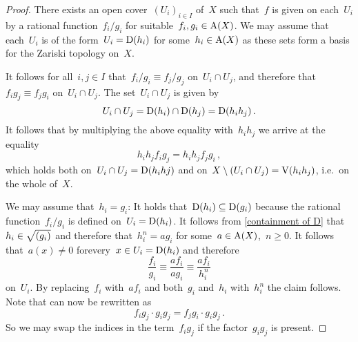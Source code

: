 \begin{proof}
  There exists an open cover~$(U_i)_{i \in I}$ of~$X$ such that~$f$ is given on each~$U_i$ by a rational function~$f_i/g_i$ for suitable~$f_i, g_i \in \operatorname{A}(X)$.
  We may assume that each~$U_i$ is of the form~$U_i = \operatorname{D}(h_i)$ for some~$h_i \in \operatorname{A}(X)$ as these sets form a basis for the Zariski topology on~$X$.
  
  It follows for all~$i,j \in I$ that~$f_i/g_i \equiv f_j/g_j$ on~$U_i \cap U_j$, and therefore that~$f_i g_j \equiv f_j g_i$ on~$U_i \cap U_j$.
  The set~$U_i \cap U_j$ is given by
  \[
    U_i \cap U_j = \operatorname{D}(h_i) \cap \operatorname{D}(h_j) = \operatorname{D}(h_i h_j) \,.
  \]
  It follows that by multiplying the above equality with~$h_i h_j$ we arrive at the equality
  \begin{equation}
  \label{extended equality on intersections}
      h_i h_j f_i g_j
    = h_i h_j f_j g_i \,,
  \end{equation}
  which holds both on~$U_i \cap U_j = \operatorname{D}(h_i hj)$ and on~$X \setminus (U_i \cap U_j) = \operatorname{V}(h_i h_j)$, i.e.\ on the whole of~$X$.
  
  We may assume that~$h_i = g_i$:
  It holds that~$\operatorname{D}(h_i) \subseteq \operatorname{D}(g_i)$ because the rational function~$f_i/g_i$ is defined on~$U_i = \operatorname{D}(h_i)$.
  It follows from \cref{containment of D} that~$h_i \in \sqrt{(g_i)}$ and therefore that~$h_i^n = a g_i$ for some~$a \in \operatorname{A}(X)$,~$n \geq 0$.
  It follows that~$a(x) \neq 0$ forevery~$x \in U_i = \operatorname{D}(h_i)$ and therefore 
  \[
            \frac{f_i}{g_i}
    \equiv  \frac{a f_i}{a g_i}
    \equiv   \frac{a f_i}{h_i^n}
  \]
  on~$U_i$.
  By replacing~$f_i$ with~$a f_i$ and both~$g_i$ and~$h_i$ with~$h_i^n$ the claim follows.
  Note that  can now be rewritten as
  \begin{equation}
  \label{equality on intersections}
        f_i g_j \cdot g_i g_j
      = f_j g_i \cdot g_i g_j \,.
  \end{equation}
  So we may swap the indices in the term~$f_i g_j$ if the factor~$g_i g_j$ is present.
  

\end{proof}
